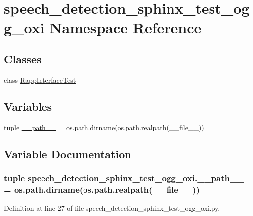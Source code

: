 \hypertarget{namespacespeech__detection__sphinx__test__ogg__oxi}{\section{speech\-\_\-detection\-\_\-sphinx\-\_\-test\-\_\-ogg\-\_\-oxi Namespace Reference}
\label{namespacespeech__detection__sphinx__test__ogg__oxi}
}
\subsection*{Classes}
\begin{DoxyCompactItemize}
\item 
class \hyperlink{classspeech__detection__sphinx__test__ogg__oxi_1_1RappInterfaceTest}{Rapp\-Interface\-Test}
\end{DoxyCompactItemize}
\subsection*{Variables}
\begin{DoxyCompactItemize}
\item 
tuple \hyperlink{namespacespeech__detection__sphinx__test__ogg__oxi_ae7a1fea1b3ff49ede88114e09b2ef339}{\-\_\-\-\_\-path\-\_\-\-\_\-} = os.\-path.\-dirname(os.\-path.\-realpath(\-\_\-\-\_\-file\-\_\-\-\_\-))
\end{DoxyCompactItemize}


\subsection{Variable Documentation}
\hypertarget{namespacespeech__detection__sphinx__test__ogg__oxi_ae7a1fea1b3ff49ede88114e09b2ef339}{
\subsubsection[{\-\_\-\-\_\-path\-\_\-\-\_\-}]{\setlength{\rightskip}{0pt plus 5cm}tuple speech\-\_\-detection\-\_\-sphinx\-\_\-test\-\_\-ogg\-\_\-oxi.\-\_\-\-\_\-path\-\_\-\-\_\- = os.\-path.\-dirname(os.\-path.\-realpath(\-\_\-\-\_\-file\-\_\-\-\_\-))}}\label{namespacespeech__detection__sphinx__test__ogg__oxi_ae7a1fea1b3ff49ede88114e09b2ef339}


Definition at line 27 of file speech\-\_\-detection\-\_\-sphinx\-\_\-test\-\_\-ogg\-\_\-oxi.\-py.


